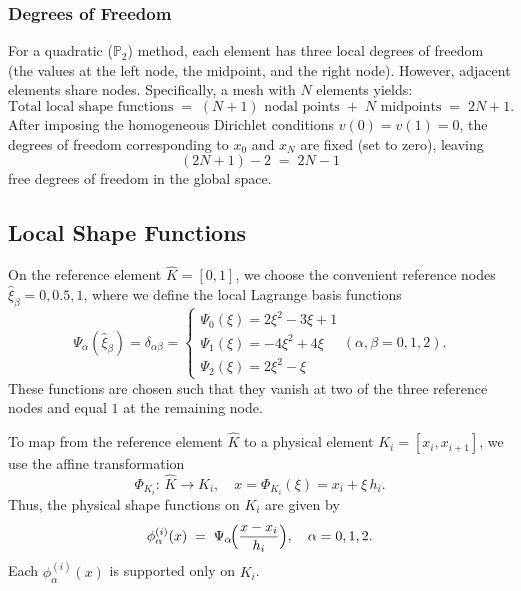 \documentclass[a4paper,10pt]{article}
\begin{document}
\subsubsection{Degrees of Freedom}
For a quadratic ($\mathbb{P}_2$) method, each element has three local degrees of freedom (the values at the left node, the midpoint, and the right node). However, adjacent elements share nodes. Specifically, a mesh with $N$ elements yields:
\[
	\text{Total local shape functions} \;=\; (N+1) \text{ nodal points} \;+\; N \text{ midpoints} \;=\; 2N+1.
\]
After imposing the homogeneous Dirichlet conditions $v(0)=v(1)=0$, the degrees of freedom corresponding to $x_0$ and $x_N$ are fixed (set to zero), leaving
\[
	(2N+1)-2 \;=\; 2N-1
\]
free degrees of freedom in the global space.

\subsection{Local Shape Functions}
On the reference element $\widehat{K}=[0,1]$, we choose the convenient reference nodes \(\widehat{\xi}_\beta=0,0.5,1\), where we define the local Lagrange basis functions
\[
	\Psi_{\alpha}(\widehat{\xi}_{\beta})
	= \delta_{\alpha\beta} =
	\begin{cases}
		\Psi_0(\xi) = 2\xi^2-3\xi+1 \\
		\Psi_1(\xi) = -4\xi^2+4\xi  \\
		\Psi_2(\xi) = 2\xi^2-\xi
	\end{cases} (\alpha,\beta=0,1,2).
\]
These functions are chosen such that they vanish at two of the three reference nodes and equal $1$ at the remaining node.

To map from the reference element $\widehat{K}$ to a physical element $K_i=[x_i,x_{i+1}]$, we use the affine transformation
\[
	\Phi_{K_i}:\,\widehat{K}\to K_i,\quad x=\Phi_{K_i}(\xi)=x_i+\xi\,h_i.
\]
Thus, the physical shape functions on $K_i$ are given by
\[
	\phi_{\alpha}^{(i)}(x) \;=\; \Psi_{\alpha}\!\Bigl(\frac{x-x_i}{h_i}\Bigr),\quad \alpha=0,1,2.
\]
Each $\phi_{\alpha}^{(i)}(x)$ is supported only on $K_i$.
\end{document}
